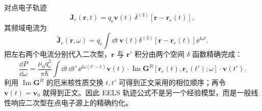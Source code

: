 \begin{derivation}
对点电子轨迹
\begin{equation*}
\mathbf J_e(\mathbf r,t)
=q_{\mathrm e}\mathbf v(t)\,
\delta^{(3)}[\mathbf r-\mathbf r_e(t)],
\end{equation*}
其频域电流为
\begin{equation*}
\widetilde{\mathbf J}_e(\mathbf r,\omega)
=q_{\mathrm e}\int\dd t\,\mathbf v(t)
\delta^{(3)}[\mathbf r-\mathbf r_e(t)]
\ee^{\ii\omega t}.
\end{equation*}
把左右两个电流分别代入二次型，\(\mathbf r\) 与 \(\mathbf r'\) 积分由两个空间 \(\delta\) 函数精确完成：
\begin{equation*}
\frac{\dd P}{\dd\omega}
=\frac{\mu_0q_{\mathrm e}^2}{\pi\hbar}
\int\dd t\,\dd t'\,
\ee^{\ii\omega(t'-t)}
\mathbf v(t)\cdot
\operatorname{Im}\mathbf G^R[\mathbf r_e(t),\mathbf r_e(t');\omega]
\cdot\mathbf v(t').
\end{equation*}
利用 \(\operatorname{Im}\mathbf G^R\) 的厄米核性质交换 \(t,t'\) 可得到正文采用的相位顺序；再令 \(\mathbf v(t)=\mathbf v_0\) 就得到正文。因此 EELS 轨迹公式不是另一个经验模型，而是一般线性响应二次型在点电子源上的精确约化。
\end{derivation}

